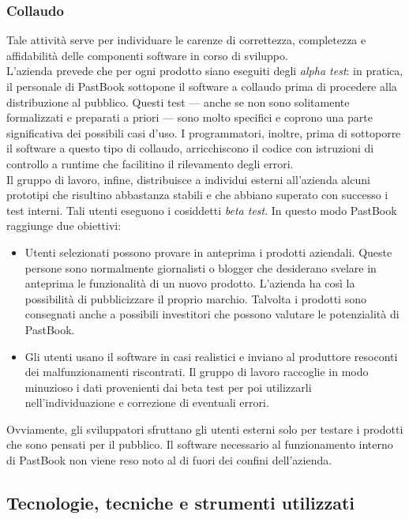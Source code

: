 			\subsubsection{Collaudo}
				Tale attività serve per individuare le carenze di correttezza, completezza e affidabilità delle componenti software
				in corso di sviluppo.\\
				L'azienda prevede che per ogni prodotto siano eseguiti degli \emph{alpha test}: in pratica, il personale di PastBook
				sottopone il software a collaudo prima di procedere alla distribuzione al pubblico. Questi test — anche se non sono
				solitamente formalizzati e preparati a priori — sono molto specifici e coprono una parte significativa dei possibili
				casi d'uso. I programmatori, inoltre, prima di sottoporre il software a questo tipo di collaudo, arricchiscono il
				codice con istruzioni di controllo a runtime che facilitino il rilevamento degli errori.\\
				Il gruppo di lavoro, infine, distribuisce a individui esterni all'azienda alcuni prototipi che risultino abbastanza
				stabili e che abbiano superato con successo i test interni. Tali utenti eseguono i cosiddetti \emph{beta test}. In
				questo modo PastBook raggiunge due obiettivi:
				\begin{itemize}
					\item Utenti selezionati possono provare in anteprima i prodotti aziendali. Queste persone sono normalmente
					giornalisti o blogger che desiderano svelare in anteprima le funzionalità di un nuovo prodotto. L'azienda ha
					così la possibilità di pubblicizzare il proprio marchio. Talvolta i prodotti sono consegnati anche a
					possibili investitori che possono valutare le potenzialità di PastBook.
					\item Gli utenti usano il software in casi realistici e inviano al produttore resoconti dei malfunzionamenti
					riscontrati. Il gruppo di lavoro raccoglie in modo minuzioso i dati provenienti dai beta test per poi
					utilizzarli nell'individuazione e correzione di eventuali errori.
				\end{itemize}
				Ovviamente, gli sviluppatori sfruttano gli utenti esterni solo per testare i prodotti che sono pensati per il
				pubblico. Il software necessario al funzionamento interno di PastBook non viene reso noto al di fuori dei confini
				dell'azienda.
		\subsection{Tecnologie, tecniche e strumenti utilizzati}
